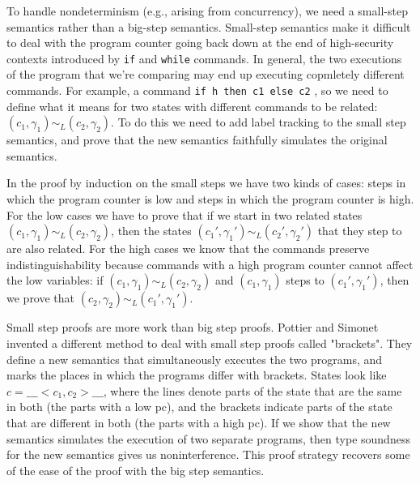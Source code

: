 \documentclass{article}
\begin{document}
To handle nondeterminism (e.g., arising from concurrency), we need a small-step semantics rather than a big-step semantics. Small-step semantics make it difficult to deal with the program counter going back down at the end of high-security contexts introduced by \texttt{if} and \texttt{while} commands. In general, the two executions of the program that we're comparing may end up executing copmletely different commands. For example, a command \texttt{if h then c1 else c2}
, so we need to define what it means for two states with different commands to be related: $(c_1, \gamma_1) \sim_L (c_2, \gamma_2)$. To do this we need to add label tracking to the small step semantics, and prove that the new semantics faithfully simulates the original semantics.

In the proof by induction on the small steps we have two kinds of cases: steps in which the program counter is low and steps in which the program counter is high. 
For the low cases we have to prove that if we start in two related states $(c_1,\gamma_1) \sim_L (c_2, \gamma_2)$, then the states $(c_1', \gamma_1') \sim_L (c_2', \gamma_2')$ that they step to are also related.
For the high cases we know that the commands preserve indistinguishability because commands with a high program counter cannot affect the low variables: if $(c_1, \gamma_1) \sim_L (c_2, \gamma_2)$ and $(c_1, \gamma_1)$ steps to $(c_1', \gamma_1')$, then we prove that $(c_2,\gamma_2) \sim_L (c_1', \gamma_1')$.

Small step proofs are more work than big step proofs. Pottier and Simonet \cite{pottier2003information} invented a different method to deal with small step proofs called "brackets". They define a new semantics that simultaneously executes the two programs, and marks the places in which the programs differ with brackets. States look like $c = \_\_\_<c_1,c_2>\_\_\_$, where the lines denote parts of the state that are the same in both (the parts with a low pc), and the brackets indicate parts of the state that are different in both (the parts with a high pc). If we show that the new semantics simulates the execution of two separate programs, then type soundness for the new semantics gives us noninterference. This proof strategy recovers some of the ease of the proof with the big step semantics.


\end{document}
